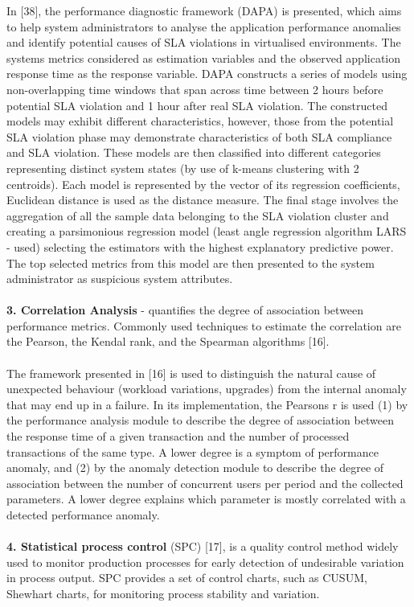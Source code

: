 \documentclass[]{usiinfprospectus}
\begin{document}
In [38], the performance diagnostic framework (DAPA) is presented, which aims to help system administrators to analyse the application performance anomalies and identify potential causes of SLA violations in virtualised environments. The systems metrics considered as estimation variables and the observed application response time as the response variable. DAPA constructs a series of models using non-overlapping time windows that span across time between 2 hours before potential SLA violation and 1 hour after real SLA violation. The constructed models may exhibit different characteristics, however, those from the potential SLA violation phase may demonstrate characteristics of both SLA compliance and SLA violation. These models are then classified into different categories representing distinct system states (by use of k-means clustering with 2 centroids). Each model is represented by the vector of its regression coefficients, Euclidean distance is used as the distance measure. The final stage involves the aggregation of all the sample data belonging to the SLA violation cluster and creating a parsimonious regression model (least angle regression algorithm  LARS - used) selecting the estimators with the highest explanatory predictive power. The top selected metrics from this model are then presented to the system administrator as suspicious system attributes.\\\\
%
\textbf {3. Correlation Analysis} - quantifies the degree of association between performance metrics. Commonly used techniques to estimate the correlation are the Pearson, the Kendal rank, and the Spearman algorithms [16].\\\\
The framework presented in [16] is used to distinguish the natural cause of unexpected behaviour (workload variations, upgrades) from the internal anomaly that may end up in a failure. In its implementation, the Pearsons r is used (1) by the performance analysis module to describe the degree of association between the response time of a given transaction and the number of processed transactions of the same type. A lower degree is a symptom of performance anomaly, and (2) by the anomaly detection module to describe the degree of association between the number of concurrent users per period and the collected parameters. A lower degree explains which parameter is mostly correlated with a detected performance anomaly.\\\\
%
\textbf {4. Statistical process control} (SPC) [17], is a quality control method widely used to monitor production processes for early detection of undesirable variation in process output. SPC provides a set of control charts, such as CUSUM, Shewhart charts, for monitoring process stability and variation.\\\\
\end{document}
